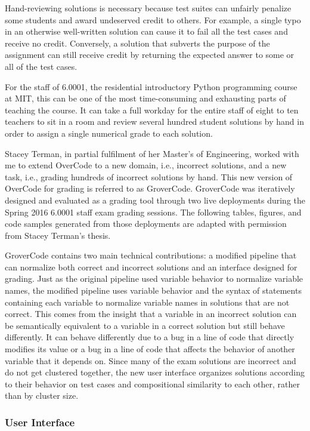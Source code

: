 Hand-reviewing solutions is necessary because test suites can unfairly penalize some students and award undeserved credit to others. For example, a single typo in an otherwise well-written solution can cause it to fail all the test cases and receive no credit. Conversely, a solution that subverts the purpose of the assignment can still receive credit by returning the expected answer to some or all of the test cases.

For the staff of 6.0001, the residential introductory Python programming course at MIT, this can be one of the most time-consuming and exhausting parts of teaching the course. It can take a full workday for the entire staff of eight to ten teachers to sit in a room and review several hundred student solutions by hand in order to assign a single numerical grade to each solution.

Stacey Terman, in partial fulfilment of her Master's of Engineering, worked with me to extend OverCode to a new domain, i.e., incorrect solutions, and a new task, i.e., grading hundreds of incorrect solutions by hand. This new version of OverCode for grading is referred to as GroverCode. GroverCode was iteratively designed and evaluated as a grading tool through two live deployments during the Spring 2016 6.0001 staff exam grading sessions. The following tables, figures, and code samples generated from those deployments are adapted with permission from Stacey Terman's thesis.

GroverCode contains two main technical contributions: a modified pipeline that can normalize both correct and incorrect solutions and an interface designed for grading. Just as the original pipeline used variable behavior to normalize variable names, the modified pipeline uses variable behavior and the syntax of statements containing each variable to normalize variable names in solutions that are not correct. This comes from the insight that a variable in an incorrect solution can be semantically equivalent to a variable in a correct solution but still behave differently. It can behave differently due to a bug in a line of code that directly modifies its value or a bug in a line of code that affects the behavior of another variable that it depends on. Since many of the exam solutions are incorrect and do not get clustered together, the new user interface organizes solutions according to their behavior on test cases and compositional similarity to each other, rather than by cluster size.

\subsubsection{User Interface}

